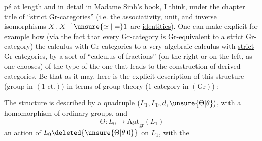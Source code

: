 %
pé at length and in detail in Madame Sinh's book, I think, under the chapter title of ``\uline{strict} Gr-categories'' (i.e.  the associativity, unit, and inverse isomorphisms $X\mathbin{.}X^{-1}\unsure{\simeq|=}1$ are \uline{identities}). One can make explicit for example how (via the fact that every Gr-category is Gr-equivalent to a strict Gr-category) the calculus with Gr-categories  to a very algebraic calculus with \uline{strict} Gr-categories, by a sort of ``calculus of fractions'' (on the right or on the left, as one chooses) of the type of the one that leads to the construction of derived categories. Be that as it may, here is the explicit description of this structure (group in $(1\text{-ct.})$) in terms of group theory ($1$-category in $(\mathrm{Gr})$) :

The structure is described by a  quadruple $(L_1,L_0,d,\unsure{\Theta|\theta})$, with
a homomorphism of ordinary groups, and
\[
\Theta:L_0\longrightarrow\underline{\mathrm{Aut}}_{\mathrm{gr}}(L_1)
\]
an action of $L_0\deleted{\unsure{\Theta|\theta|0}}$ on $L_1$, with the
